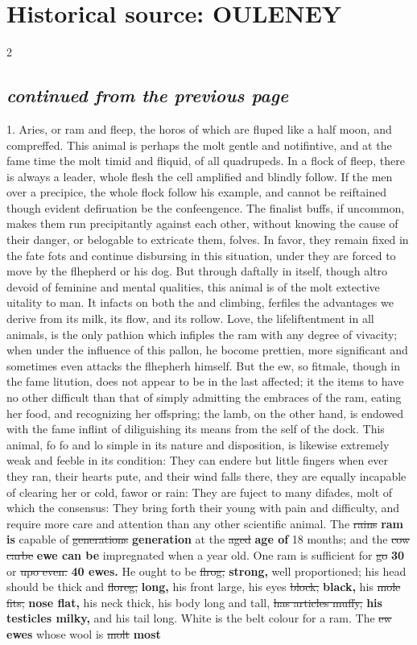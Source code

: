 \documentclass[10pt]{article}
\begin{document}
\section*{Historical source: OULENEY}
\begin{multicols}{2}
\subsection*{\textit{continued from the previous page}}
1. Aries, or ram and fleep, the horos of which are fluped like a half moon, and compreffed. This animal is perhaps the molt gentle and notifintive, and at the fame time the molt timid and fliquid, of all quadrupeds. In a flock of fleep, there is always a leader, whole flesh the cell amplified and blindly follow. If the men over a precipice, the whole flock follow his example, and cannot be reiftained though evident defiruation be the confeengence. The finalist buffs, if uncommon, makes them run precipitantly against each other, without knowing the cause of their danger, or belogable to extricate them, folves. In favor, they remain fixed in the fate fots and continue disbursing in this situation, under they are forced to move by the flhepherd or his dog. But through daftally in itself, though altro devoid of feminine and mental qualities, this animal is of the molt extective uitality to man. It infacts on both the and climbing, ferfiles the advantages we derive from its milk, its flow, and its rollow. Love, the lifeliftentment in all animals, is the only pathion which infiples the ram with any degree of vivacity; when under the influence of this pallon, he bocome prettien, more significant and sometimes even attacks the flhepherh himself. But the ew, so fitmale, though in the fame litution, does not appear to be in the last affected; it the items to have no other difficult than that of simply admitting the embraces of the ram, eating her food, and recognizing her offspring; the lamb, on the other hand, is endowed with the fame inflint of diliguishing its means from the self of the dock. This animal, fo fo and lo simple in its nature and disposition, is likewise extremely weak and feeble in its condition: They can endere but little fingers when ever they ran, their hearts pute, and their wind falls there, they are equally incapable of clearing her or cold, fawor or rain: They are fuject to many difades, molt of which the consensus: They bring forth their young with pain and difficulty, and require more care and attention than any other scientific animal. The \sout{rains} \textbf{ram is} capable of \sout{generations} \textbf{generation} at the \sout{aged} \textbf{age of} 18 months; and the \sout{cow carbe} \textbf{ewe can be} impregnated when a year old. One ram is sufficient for \sout{go} \textbf{30} or \sout{upo even.} \textbf{40 ewes.} He ought to be \sout{flrog,} \textbf{strong,} well proportioned; his head should be thick and \sout{floreg,} \textbf{long,} his front large, his eyes \sout{block,} \textbf{black,} his \sout{mole fits,} \textbf{nose flat,} his neck thick, his body long and tall, \sout{has articles muffy,} \textbf{his testicles milky,} and his tail long. White is the belt colour for a ram. The \sout{ew} \textbf{ewes} whose wool is \sout{molt} \textbf{most} 
\end{multicols}
\end{document}

